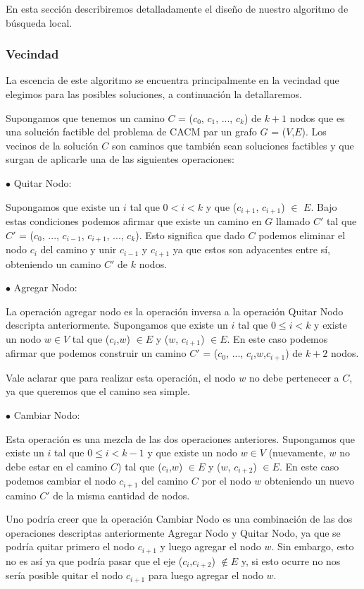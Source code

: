 En esta sección describiremos detalladamente el diseño de nuestro algoritmo de búsqueda local. 

\subsubsection{Vecindad}

La escencia de este algoritmo se encuentra principalmente en la vecindad que elegimos para las posibles soluciones, a continuación la detallaremos.

Supongamos que tenemos un camino $C$ = ($c_0$, $c_1$, ..., $c_k$) de $k+1$ nodos que es una solución factible del problema de CACM par un grafo $G$ = ($V$,$E$). Los vecinos de la solución $C$ son caminos que también sean soluciones factibles y que surgan de aplicarle una de las siguientes operaciones:

$\bullet$ Quitar Nodo:

Supongamos que existe un $i$ tal que $0 < i < k$ y que ($c_{i+1}$, $c_{i+1}$) $\in$ $E$. Bajo estas condiciones podemos afirmar que existe un camino en $G$ llamado $C'$ tal que $C'$ = ($c_0$, ..., $c_{i-1}$, $c_{i+1}$, ..., $c_k$). Esto significa que dado $C$ podemos eliminar el nodo $c_i$ del camino y unir $c_{i-1}$ y $c_{i+1}$ ya que estos son adyacentes entre sí, obteniendo un camino $C'$ de $k$ nodos.

$\bullet$ Agregar Nodo:

La operación agregar nodo es la operación inversa a la operación Quitar Nodo descripta anteriormente. Supongamos que existe un $i$ tal que $0 \leq i < k$ y existe un nodo $w \in V$ tal que ($c_i$,$w$) $\in E$ y ($w$, $c_{i+1}$) $\in E$. En este caso podemos afirmar que podemos construir un camino $C'$ = ($c_0$, ..., $c_{i}$,$w$,$c_{i+1}$) de $k+2$ nodos.

Vale aclarar que para realizar esta operación, el nodo $w$ no debe pertenecer a $C$, ya que queremos que el camino sea simple.

$\bullet$ Cambiar Nodo:

Esta operación es una mezcla de las dos operaciones anteriores. Supongamos que existe un $i$ tal que $0 \leq i < k-1$ y que existe un nodo $w \in V$ (nuevamente, $w$ no debe estar en el camino $C$) tal que ($c_i$,$w$) $\in E$ y ($w$, $c_{i+2}$) $\in E$. En este caso podemos cambiar el nodo $c_{i+1}$ del camino $C$ por el nodo $w$ obteniendo un nuevo camino $C'$ de la misma cantidad de nodos.

Uno podría creer que la operación Cambiar Nodo es una combinación de las dos operaciones descriptas anteriormente Agregar Nodo y Quitar Nodo, ya que se podría quitar primero el nodo $c_{i+1}$ y luego agregar el nodo $w$. Sin embargo, esto no es así ya que podría pasar que el eje ($c_i$,$c_{i+2}$) $\notin E$ y, si esto ocurre no nos sería posible quitar el nodo $c_{i+1}$ para luego agregar el nodo $w$.

